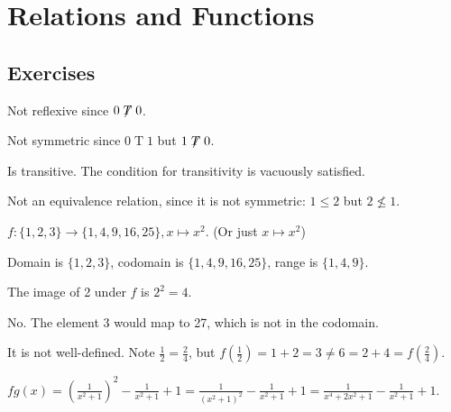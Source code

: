\section{Relations and Functions}
\subsection*{Exercises}
\begin{questions}
    \item \begin{partquestions}{\alph*}
        \item Not reflexive since $0\not\mathrel{T}0$.
        \item Not symmetric since $0\mathrel{T}1$ but $1\not\mathrel{T}0$.
        \item Is transitive. The condition for transitivity is vacuously satisfied.
    \end{partquestions}

    \item Not an equivalence relation, since it is not symmetric: $1 \leq 2$ but $2 \not\leq 1$.

    \item \begin{partquestions}{\roman*}
        \item $f: \{1, 2, 3\} \to \{1, 4, 9, 16, 25\}, x \mapsto x^2$. (Or just $x \mapsto x^2$)
        \item Domain is $\{1, 2, 3\}$, codomain is $\{1, 4, 9, 16, 25\}$, range is $\{1, 4, 9\}$.
        \item The image of 2 under $f$ is $2^2 = 4$.
        \item No. The element 3 would map to 27, which is not in the codomain.
    \end{partquestions}

    \item It is not well-defined. Note $\frac 12 = \frac 24$, but $f(\frac12) = 1 + 2 = 3 \neq 6 = 2 + 4 = f(\frac24)$.

    \item $fg(x) = \left(\frac1{x^2+1}\right)^2 - \frac1{x^2+1} + 1 = \frac1{(x^2+1)^2} - \frac1{x^2+1} + 1 = \frac1{x^4+2x^2+1} - \frac1{x^2+1} + 1$.


\end{questions}
